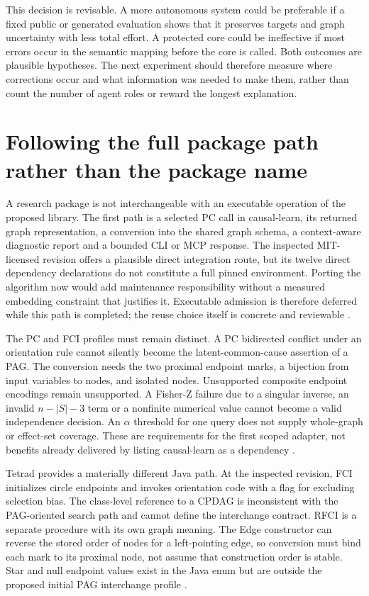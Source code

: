 This decision is revisable. A more autonomous system could be preferable if a
fixed public or generated evaluation shows that it preserves targets and graph
uncertainty with less total effort. A protected core could be ineffective if
most errors occur in the semantic mapping before the core is called. Both
outcomes are plausible hypotheses. The next experiment should therefore measure
where corrections occur and what information was needed to make them, rather
than count the number of agent roles or reward the longest explanation.

\section{Following the full package path rather than the package name}

A research package is not interchangeable with an executable operation of the
proposed library. The first path is a selected PC call in causal-learn, its
returned graph representation, a conversion into the shared graph schema,
a context-aware diagnostic report and a bounded CLI or MCP response. The
inspected MIT-licensed revision offers a plausible direct integration route,
but its twelve direct dependency declarations do not constitute a full pinned
environment. Porting the algorithm now would add maintenance responsibility
without a measured embedding constraint that justifies it. Executable admission
is therefore deferred while this path is completed; the reuse choice itself is
concrete and reviewable \citep{exec14_causallearn_reuse}.

The PC and FCI profiles must remain distinct. A PC bidirected conflict under an
orientation rule cannot silently become the latent-common-cause assertion of a
PAG. The conversion needs the two proximal endpoint marks, a bijection from
input variables to nodes, and isolated nodes. Unsupported composite endpoint
encodings remain unsupported. A Fisher-Z failure due to a singular inverse,
an invalid $n-|S|-3$ term or a nonfinite numerical value cannot become a valid
independence decision. An $\alpha$ threshold for one query does not supply
whole-graph or effect-set coverage. These are requirements for the first scoped
adapter, not benefits already delivered by listing causal-learn as a dependency
\citep{exec14_causallearn_reuse}.

Tetrad provides a materially different Java path. At the inspected revision,
FCI initializes circle endpoints and invokes orientation code with a flag for
excluding selection bias. The class-level reference to a CPDAG is inconsistent
with the PAG-oriented search path and cannot define the interchange contract.
RFCI is a separate procedure with its own graph meaning. The Edge constructor
can reverse the stored order of nodes for a left-pointing edge, so conversion
must bind each mark to its proximal node, not assume that construction order
is stable. Star and null endpoint values exist in the Java enum but are outside
the proposed initial PAG interchange profile
\citep{exec14_java_latent_sources}.

